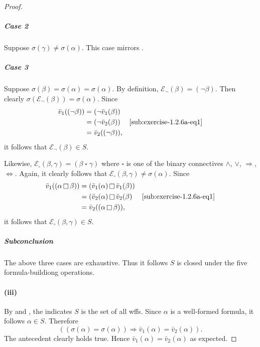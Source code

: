 \documentclass{report}
\begin{document}
\begin{proof}
      \subparagraph{Case 2}%

        Suppose $\sigma(\gamma) \neq \sigma(\alpha)$.
        This case mirrors .

      \subparagraph{Case 3}%

        Suppose $\sigma(\beta) = \sigma(\alpha) = \sigma(\alpha)$.
        By definition, $\mathcal{E}_{\neg}(\beta) = (\neg\beta)$.
        Then clearly $\sigma(\mathcal{E}_{\neg}(\beta)) = \sigma(\alpha)$.
        Since
          \begin{align*}
            \bar{v}_1((\neg\beta))
              & = (\neg\bar{v}_1(\beta)) \\
              & = (\neg\bar{v}_2(\beta)) & \eqref{sub:exercise-1.2.6a-eq1} \\
              & = \bar{v}_2((\neg\beta)),
          \end{align*}
          it follows that $\mathcal{E}_{\neg}(\beta) \in S$.

        Likewise,
          $\mathcal{E}_{\square}(\beta, \gamma) =
            (\beta \mathop{\square} \gamma)$
          where $\square$ is one of the binary connectives $\land$, $\lor$,
            $\Rightarrow$, $\Leftrightarrow$.
        Again, it clearly follows that
          $\mathcal{E}_{\square}(\beta, \gamma) \neq \sigma(\alpha)$.
        Since
          \begin{align*}
            \bar{v}_1((\alpha \mathop{\square} \beta))
              & = (\bar{v}_1(\alpha) \mathop{\square} \bar{v}_1(\beta)) \\
              & = (\bar{v}_2(\alpha) \mathop{\square} \bar{v}_2(\beta)
                & \eqref{sub:exercise-1.2.6a-eq1} \\
              & = \bar{v}_2((\alpha \mathop{\square} \beta)),
          \end{align*}
          it follows that $\mathcal{E}_{\square}(\beta, \gamma) \in S$.

      \subparagraph{Subconclusion}%

        The above three cases are exhaustive.
        Thus it follows $S$ is closed under the five formula-buildiong
          operations.

    \paragraph{(iii)}%

      By  and ,
        the  indicates $S$ is the set of all
        wffs.
      Since $\alpha$ is a well-formed formula, it follows $\alpha \in S$.
      Therefore
        $$((\sigma(\alpha) = \sigma(\alpha)) \Rightarrow
          \bar{v}_1(\alpha) = \bar{v}_2(\alpha)).$$
      The antecedent clearly holds true.
      Hence $\bar{v}_1(\alpha) = \bar{v}_2(\alpha)$ as expected.

  \end{proof}
\end{document}
